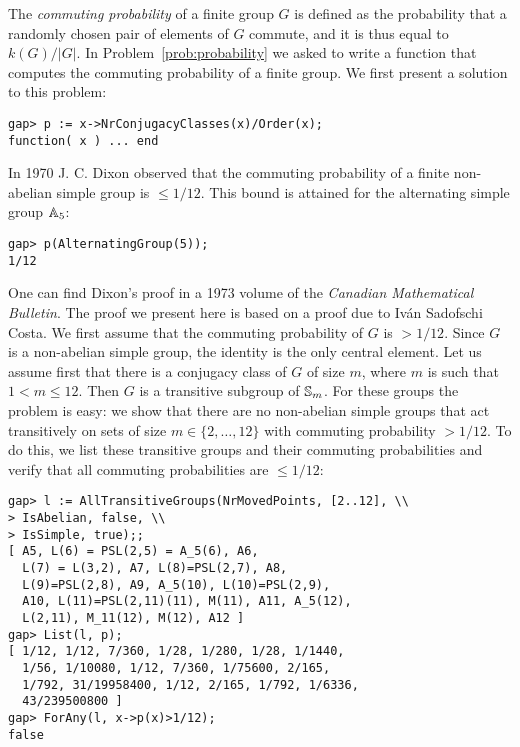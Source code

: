 The \emph{commuting probability} of a finite group $G$ is defined as the probability
that a randomly chosen pair of elements of $G$ commute, and it is thus equal to
$k(G)/|G|$. In Problem~\ref{prob:probability} we asked to write a function that
computes the commuting probability of a finite group. 
We first present a solution to this problem:

\begin{lstlisting}
gap> p := x->NrConjugacyClasses(x)/Order(x);
function( x ) ... end
\end{lstlisting}

In 1970 J. C. Dixon observed that the commuting probability of a finite
non-abelian simple group is $\leq 1/12$. This bound is attained for the
alternating simple group $\mathbb{A}_5$:

\begin{lstlisting}
gap> p(AlternatingGroup(5));                
1/12
\end{lstlisting}

One can find Dixon's proof in a 1973 volume of the \emph{Canadian Mathematical
Bulletin}. The proof we present here is based on a proof due to Iv\'an Sadofschi
Costa. We first assume that the commuting probability of $G$ is $>1/12$. Since
$G$ is a non-abelian simple group, the identity is the only central element. 
Let us assume first that there is a conjugacy class of $G$ of size $m$, where
$m$ is such that $1<m\leq 12$. Then $G$ is a transitive subgroup of $\mathbb{S}_m$.
For these groups the problem is easy: we show that there are no non-abelian simple groups
that act transitively on sets of size $m\in\{2,\dots,12\}$ with commuting
probability $>1/12$. To do this, we list these transitive groups and their commuting
probabilities and verify that all commuting probabilities are $\leq
1/12$:
\begin{lstlisting}
gap> l := AllTransitiveGroups(NrMovedPoints, [2..12], \\
> IsAbelian, false, \\
> IsSimple, true);;
[ A5, L(6) = PSL(2,5) = A_5(6), A6, 
  L(7) = L(3,2), A7, L(8)=PSL(2,7), A8, 
  L(9)=PSL(2,8), A9, A_5(10), L(10)=PSL(2,9), 
  A10, L(11)=PSL(2,11)(11), M(11), A11, A_5(12), 
  L(2,11), M_11(12), M(12), A12 ]
gap> List(l, p);           
[ 1/12, 1/12, 7/360, 1/28, 1/280, 1/28, 1/1440, 
  1/56, 1/10080, 1/12, 7/360, 1/75600, 2/165, 
  1/792, 31/19958400, 1/12, 2/165, 1/792, 1/6336, 
  43/239500800 ]
gap> ForAny(l, x->p(x)>1/12);
false
\end{lstlisting}


